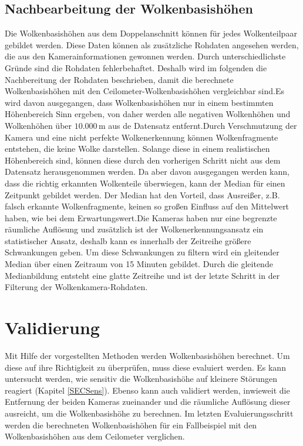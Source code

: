 \documentclass[a4paper,11pt,twoside,german]{article}
\newcommand{\absatz}{\smallbreak}
\begin{document}
\subsection{Nachbearbeitung der Wolkenbasishöhen}
\label{SECHeightPost} 
Die Wolkenbasishöhen aus dem Doppelanschnitt können für jedes Wolkenteilpaar
gebildet werden. Diese Daten können als zusätzliche Rohdaten angesehen werden,
die aus den Kamerainformationen gewonnen werden.  Durch unterschiedlichste
Gründe sind die Rohdaten fehlerbehaftet. Deshalb wird im folgenden die
Nachbereitung der Rohdaten beschrieben, damit die berechnete Wolkenbasishöhen
mit den Ceilometer-Wolkenbasishöhen vergleichbar sind.\absatz Es wird davon ausgegangen, dass
Wolkenbasishöhen nur in einem bestimmten Höhenbereich Sinn ergeben, von daher
werden alle negativen Wolkenhöhen und Wolkenhöhen über $10.000\,\mathrm{m}$ 
aus de Datensatz entfernt.\absatz Durch Verschmutzung der Kamera und eine
nicht perfekte Wolkenerkennung können Wolkenfragmente entstehen, die keine Wolke
darstellen.  Solange diese in einem realistischen Höhenbereich sind, können
diese durch den vorherigen Schritt nicht aus dem Datensatz herausgenommen
werden. Da aber davon ausgegangen werden kann, dass die richtig erkannten
Wolkenteile überwiegen, kann der Median für einen Zeitpunkt gebildet werden. Der
Median hat den Vorteil, dass Ausreißer, z.B. falsch erkannte Wolkenfragmente,
keinen so großen Einfluss auf den Mittelwert haben, wie bei dem
Erwartungswert.\absatz Die Kameras haben nur eine begrenzte räumliche Auflösung
und zusätzlich ist der Wolkenerkennungsansatz ein statistischer Ansatz, deshalb
kann es innerhalb der Zeitreihe größere Schwankungen geben. Um diese
Schwankungen zu filtern wird ein gleitender Median über einen Zeitraum von 15
Minuten gebildet. Durch die gleitende Medianbildung entsteht eine glatte
Zeitreihe und ist der letzte Schritt in der Filterung der
Wolkenkamera-Rohdaten.\absatz


\section{Validierung}
\label{SECValidation}
Mit Hilfe der vorgestellten Methoden werden Wolkenbasishöhen berechnet. Um diese
auf ihre Richtigkeit zu überprüfen, muss diese evaluiert werden. Es kann
untersucht werden, wie sensitiv die Wolkenbasishöhe auf kleinere Störungen
reagiert (Kapitel \ref{SECSens}). Ebenso kann auch validiert werden, inwieweit
die Entfernung der beiden Kameras zueinander und die räumliche Auflösung dieser
ausreicht, um die Wolkenbasishöhe zu berechnen. Im letzten Evaluierungsschritt
werden die berechneten Wolkenbasishöhen für ein Fallbeispiel mit den
Wolkenbasishöhen aus dem Ceilometer verglichen.  
\end{document}
